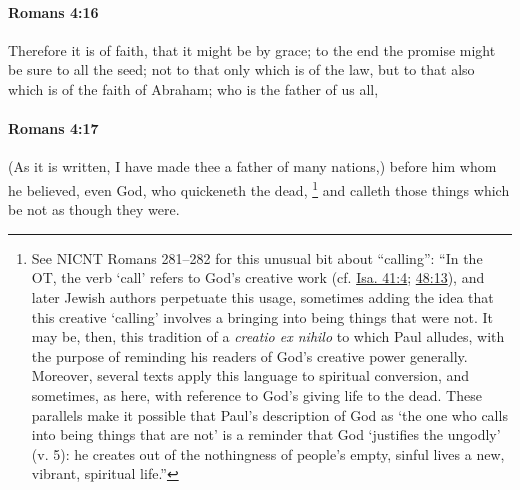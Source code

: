 		\paragraph{Romans 4:16} %
			\label{ROMANS-4-16}

			Therefore it is of faith, that it might be by grace; to the end the promise might be sure to all the seed; not to that only which is of the law, but to that also which is of the faith of Abraham; who is the father of us all,

			\begin{framed}
			\scriptsize
				\begin{compactdesc}
					\item[SBLG] 
				\end{compactdesc}
			\end{framed}

		\paragraph{Romans 4:17} %
			\label{ROMANS-4-17}

			(As it is written, I have made thee a father of many nations,) before him whom he believed, even God, who quickeneth the dead,
				\footnote{%
					See NICNT Romans 281--282 for this unusual bit about ``calling'': ``In the OT, the verb `call' refers to God's creative work (cf. \hyperref[ISAIAH-41-4]{Isa. 41:4}; \hyperref[ISAIAH-48-13]{48:13}), and later Jewish authors perpetuate this usage, sometimes adding the idea that this creative `calling' involves a bringing into being things that were not. It may be, then, this tradition of a \textit{creatio ex nihilo} to which Paul alludes, with the purpose of reminding his readers of God's creative power generally. Moreover, several texts apply this language to spiritual conversion, and sometimes, as here, with reference to God's giving life to the dead. These parallels make it possible that Paul's description of God as `the one who calls into being things that are not' is a reminder that God `justifies the ungodly' (v. 5): he creates out of the nothingness of people's empty, sinful lives a new, vibrant, spiritual life.''
					}%
			and calleth those things which be not as though they were.

